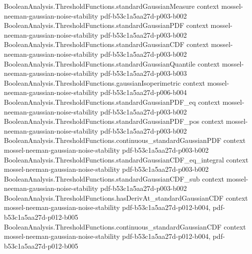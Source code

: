 \begin{lemma}
\label{BooleanAnalysis.GaussianSpace.mul_le_gaussianBivariateStability}
\leanok
{}
\proofstep
  {BooleanAnalysis.ThresholdFunctions.standardGaussianMeasure}
  {context}
  {mossel-neeman-gaussian-noise-stability}
  {pdf-b53c1a5aa27d-p003-b002}
\proofstep
  {BooleanAnalysis.ThresholdFunctions.standardGaussianPDF}
  {context}
  {mossel-neeman-gaussian-noise-stability}
  {pdf-b53c1a5aa27d-p003-b002}
\proofstep
  {BooleanAnalysis.ThresholdFunctions.standardGaussianCDF}
  {context}
  {mossel-neeman-gaussian-noise-stability}
  {pdf-b53c1a5aa27d-p003-b002}
\proofstep
  {BooleanAnalysis.ThresholdFunctions.standardGaussianQuantile}
  {context}
  {mossel-neeman-gaussian-noise-stability}
  {pdf-b53c1a5aa27d-p003-b003}
\proofstep
  {BooleanAnalysis.ThresholdFunctions.gaussianIsoperimetric}
  {context}
  {mossel-neeman-gaussian-noise-stability}
  {pdf-b53c1a5aa27d-p006-b004}
\proofstep
  {BooleanAnalysis.ThresholdFunctions.standardGaussianPDF_eq}
  {context}
  {mossel-neeman-gaussian-noise-stability}
  {pdf-b53c1a5aa27d-p003-b002}
\proofstep
  {BooleanAnalysis.ThresholdFunctions.standardGaussianPDF_pos}
  {context}
  {mossel-neeman-gaussian-noise-stability}
  {pdf-b53c1a5aa27d-p003-b002}
\proofstep
  {BooleanAnalysis.ThresholdFunctions.continuous_standardGaussianPDF}
  {context}
  {mossel-neeman-gaussian-noise-stability}
  {pdf-b53c1a5aa27d-p003-b002}
\proofstep
  {BooleanAnalysis.ThresholdFunctions.standardGaussianCDF_eq_integral}
  {context}
  {mossel-neeman-gaussian-noise-stability}
  {pdf-b53c1a5aa27d-p003-b002}
\proofstep
  {BooleanAnalysis.ThresholdFunctions.standardGaussianCDF_sub}
  {context}
  {mossel-neeman-gaussian-noise-stability}
  {pdf-b53c1a5aa27d-p003-b002}
\proofstep
  {BooleanAnalysis.ThresholdFunctions.hasDerivAt_standardGaussianCDF}
  {context}
  {mossel-neeman-gaussian-noise-stability}
  {pdf-b53c1a5aa27d-p012-b004,
    pdf-b53c1a5aa27d-p012-b005}
\proofstep
  {BooleanAnalysis.ThresholdFunctions.continuous_standardGaussianCDF}
  {context}
  {mossel-neeman-gaussian-noise-stability}
  {pdf-b53c1a5aa27d-p012-b004,
    pdf-b53c1a5aa27d-p012-b005}

\end{lemma}
